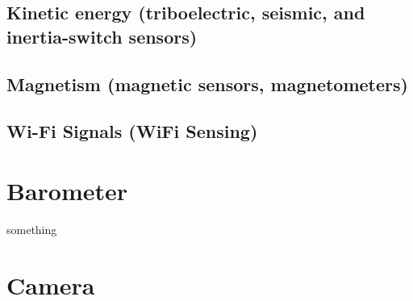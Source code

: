 \documentclass[a4paper]{article}
\begin{document}
    \subsection{Kinetic energy (triboelectric, seismic, and inertia-switch sensors)}
    
    \subsection{Magnetism (magnetic sensors, magnetometers)}
    
    \subsection{Wi-Fi Signals (WiFi Sensing)}
    
    
    \section{Barometer}
    something
    
    \section{Camera}
\end{document}
